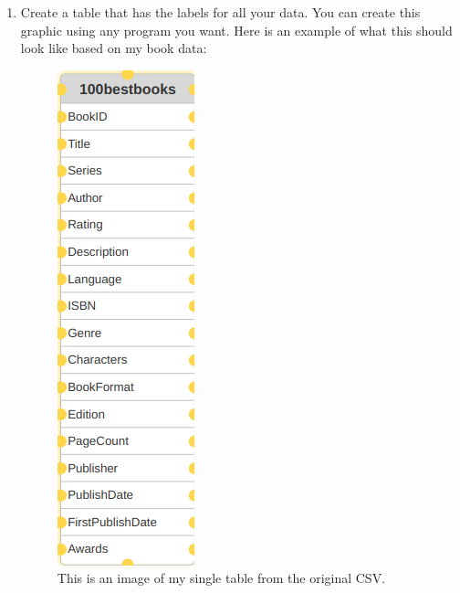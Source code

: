 \documentclass[12pt]{article}
\begin{document}
    \begin{enumerate}
        \item Create a table that has the labels for all your data. You can create this graphic using any program you want. Here is an example of what this should look like based on my book data: 
        
        \begin{figure}[h!]
            \centerline{\includegraphics[scale=.3]{Table1Example1_100bestbooks.png}}
            \caption{This is an image of my single table from the original CSV.}

            \end{figure}


\end{enumerate}
\end{document}
